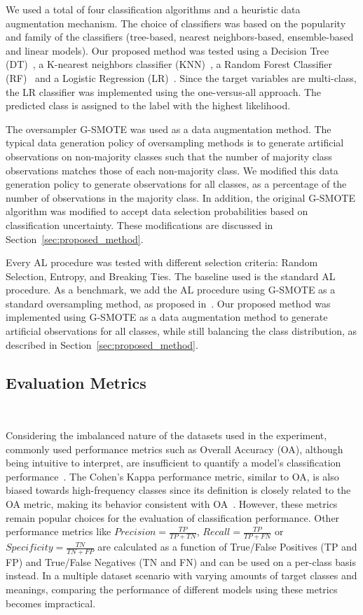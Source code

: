 \documentclass[parskip=full]{scrartcl}
\begin{document}
We used a total of four classification algorithms and a heuristic data
augmentation mechanism. The choice of classifiers was based on the popularity
and family of the classifiers (tree-based, nearest neighbors-based,
ensemble-based and linear models). Our proposed method was tested using a
Decision Tree (DT)~\cite{Wu1975}, a K-nearest neighbors classifier
(KNN)~\cite{Cover1967}, a Random Forest Classifier (RF)~\cite{Ho1995} and a
Logistic Regression (LR)~\cite{Nelder1972}. Since the target variables are
multi-class, the LR classifier was implemented using the one-versus-all
approach. The predicted class is assigned to the label with the highest
likelihood.
 
The oversampler G-SMOTE was used as a data augmentation method. The typical
data generation policy of oversampling methods is to generate artificial
observations on non-majority classes such that the number of majority class
observations matches those of each non-majority class. We modified this data
generation policy to generate observations for all classes, as a percentage of
the number of observations in the majority class. In addition, the original
G-SMOTE algorithm was modified to accept data selection probabilities based on
classification uncertainty. These modifications are discussed in
Section~\ref{sec:proposed_method}.

Every AL procedure was tested with different selection criteria: Random
Selection, Entropy, and Breaking Ties. The baseline used is the standard AL
procedure. As a benchmark, we add the AL procedure using G-SMOTE as a standard
oversampling method, as proposed in~\cite{Fonseca2021}. Our proposed method
was implemented using G-SMOTE as a data augmentation method to generate
artificial observations for all classes, while still balancing the class
distribution, as described in Section~\ref{sec:proposed_method}. 
 
\subsection{Evaluation Metrics}~\label{sec:evaluation_metrics}

Considering the imbalanced nature of the datasets used in the experiment,
commonly used performance metrics such as Overall Accuracy (OA), although
being intuitive to interpret, are insufficient to quantify a model's
classification performance~\cite{Jeni2013}. The Cohen's Kappa performance
metric, similar to OA, is also biased towards high-frequency classes since its
definition is closely related to the OA metric, making its behavior consistent
with OA~\cite{Fatourechi2008}. However, these metrics remain popular choices
for the evaluation of classification performance. Other performance metrics
like $Precision = \frac{TP}{TP+TN}$, $Recall = \frac{TP}{TP+FN}$ or
$Specificity = \frac{TN}{TN + FP}$ are calculated as a function of True/False
Positives (TP and FP) and True/False Negatives (TN and FN) and can be used on
a per-class basis instead. In a multiple dataset scenario with varying amounts
of target classes and meanings, comparing the performance of different models
using these metrics becomes impractical.
 
\end{document}
